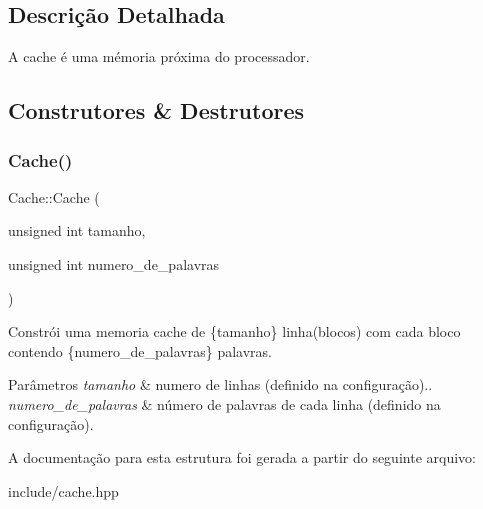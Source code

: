 \subsection{Descrição Detalhada}
A cache é uma mémoria próxima do processador. 

\subsection{Construtores \& Destrutores}
\mbox{\label{structCache_a9f868538691619d64b59b858ae0461a8}} 
\subsubsection{\texorpdfstring{Cache()}{Cache()}}
{\footnotesize\ttfamily Cache\+::\+Cache (\begin{DoxyParamCaption}\item[{unsigned int}]{tamanho,  }\item[{unsigned int}]{numero\+\_\+de\+\_\+palavras }\end{DoxyParamCaption})\hspace{0.3cm}{\ttfamily [inline]}}



Constrói uma memoria cache de \{tamanho\} linha(blocos) com cada bloco contendo \{numero\+\_\+de\+\_\+palavras\} palavras. 


\begin{DoxyParams}{Parâmetros}
{\em tamanho} & numero de linhas (definido na configuração).. \\
\hline
{\em numero\+\_\+de\+\_\+palavras} & número de palavras de cada linha (definido na configuração). \\
\hline
\end{DoxyParams}


A documentação para esta estrutura foi gerada a partir do seguinte arquivo\+:\begin{DoxyCompactItemize}
\item 
include/cache.\+hpp\end{DoxyCompactItemize}
